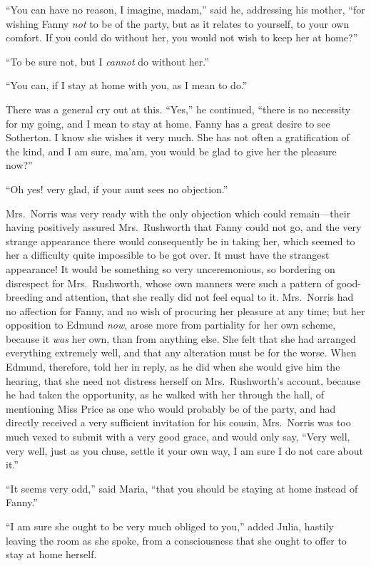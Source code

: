 ``You can have no reason, I imagine, madam,'' said he,
addressing his mother, ``for wishing Fanny \emph{not}
to be of the party, but as it relates to yourself,
to your own comfort.  If you could do without her,
you would not wish to keep her at home?''

``To be sure not, but I \emph{cannot} do without her.''

``You can, if I stay at home with you, as I mean to do.''

There was a general cry out at this.  ``Yes,'' he continued,
``there is no necessity for my going, and I mean to stay
at home.  Fanny has a great desire to see Sotherton.
I know she wishes it very much.  She has not often a
gratification of the kind, and I am sure, ma'am, you would
be glad to give her the pleasure now?''

``Oh yes! very glad, if your aunt sees no objection.''

Mrs.\ Norris was very ready with the only objection which
could remain---their having positively assured Mrs.\ Rushworth
that Fanny could not go, and the very strange appearance
there would consequently be in taking her, which seemed
to her a difficulty quite impossible to be got over.
It must have the strangest appearance!  It would be
something so very unceremonious, so bordering on disrespect
for Mrs.\ Rushworth, whose own manners were such a pattern
of good-breeding and attention, that she really did not
feel equal to it.  Mrs.\ Norris had no affection for Fanny,
and no wish of procuring her pleasure at any time;
but her opposition to Edmund \emph{now}, arose more from
partiality for her own scheme, because it \emph{was} her own,
than from anything else.  She felt that she had arranged
everything extremely well, and that any alteration must be
for the worse.  When Edmund, therefore, told her in reply,
as he did when she would give him the hearing, that she
need not distress herself on Mrs.\ Rushworth's account,
because he had taken the opportunity, as he walked with
her through the hall, of mentioning Miss Price as one
who would probably be of the party, and had directly
received a very sufficient invitation for his cousin,
Mrs.\ Norris was too much vexed to submit with a very
good grace, and would only say, ``Very well, very well,
just as you chuse, settle it your own way, I am sure I
do not care about it.''

``It seems very odd,'' said Maria, ``that you should be
staying at home instead of Fanny.''

``I am sure she ought to be very much obliged to you,''
added Julia, hastily leaving the room as she spoke,
from a consciousness that she ought to offer to stay at
home herself.

